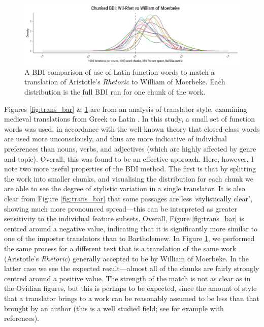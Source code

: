 \documentclass[
    hf
]{ceurart}
\begin{document}
\begin{figure}
    \includegraphics[width=\linewidth]{figures/bdi_wil_paper.png}
    \caption{A BDI comparison of use of Latin function words to match a
        translation of Aristotle's \emph{Rhetoric} to William of Moerbeke. Each
        distribution is the full BDI run for one chunk of the work.}
    \label{fig:trans_wil}
\end{figure}

Figures \ref{fig:trans_bar} \& \ref{fig:trans_wil} are from an analysis of translator style,
examining medieval translations from Greek to Latin \cite{Beullens_Haverals_Nagy_2024}. In this
study, a small set of function words was used, in accordance with the well-known theory that
closed-class words are used more unconsciously, and thus are more indicative of individual
preferences than nouns, verbs, and adjectives (which are highly affected by genre and topic). Overall,
this was found to be an effective approach. Here, however, I note two more useful properties of the
BDI method. The first is that by splitting the work into smaller chunks, and visualising the
distribution for each chunk we are able to see the degree of stylistic variation in a single
translator. It is also clear from Figure \ref{fig:trans_bar} that some passages are less
`stylistically clear', showing much more pronounced spread---this can be interpreted as greater
sensitivity to the individual feature subsets. Overall, Figure \ref{fig:trans_bar} is centred around
a negative value, indicating that it is significantly more similar to one of the imposter
translators than to Bartholemew. In Figure \ref{fig:trans_wil}, we performed the same process for a
different text that is a translation of the same work (Aristotle's \emph{Rhetoric}) generally
accepted to be by William of Moerbeke. In the latter case we see the expected result---almost all of the
chunks are fairly strongly centred around a positive value. The strength of the match is not as
clear as in the Ovidian figures, but this is perhaps to be expected, since the amount of style that
a translator brings to a work can be reasonably assumed to be less than that brought by an author
(this is a well studied field; see for example \cite{rybicki2012great} with references).
\end{document}

